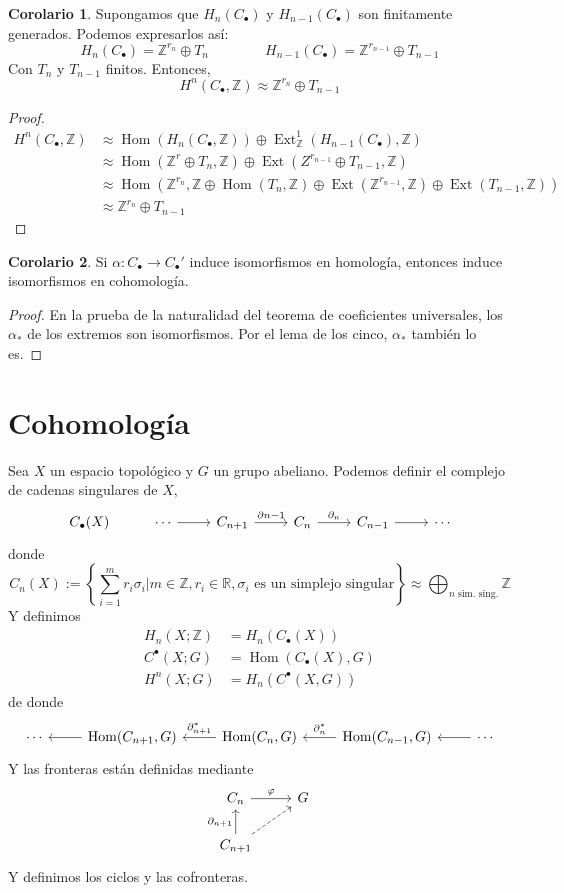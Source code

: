 \documentclass[spanish]{book}
\theoremstyle{definition}
\newtheorem*{coro}{Corolario}
\newcommand{\R}{\mathbb{R}}
\newcommand{\Z}{\mathbb{Z}}
\DeclareMathOperator{\Hom}{Hom}
\DeclareMathOperator{\Ext}{Ext}
\begin{document}
\begin{coro}
	Supongamos que $H_n(C_\bullet)$ y $H_{n-1}(C_\bullet)$ son finitamente generados. Podemos expresarlos así:
	\[H_n(C_\bullet)=\Z^{r_n}\oplus T_n\qquad\qquad H_{n-1}(C_\bullet)=\Z^{r_{n-1}}\oplus T_{n-1}\]
	Con $T_n$ y $T_{n-1}$ finitos. Entonces,
	\[H^n(C_\bullet,\Z)\approx\Z^{r_n}\oplus T_{n-1}\]
\end{coro}
\begin{proof}
	\begin{align*}
		H^n(C_\bullet,\Z)&\approx\Hom(H_n(C_\bullet,\Z))\oplus\Ext_\Z^1(H_{n-1}(C_\bullet),\Z)\\
		&\approx\Hom(\Z^r\oplus T_n,\Z)\oplus\Ext(Z^{r_{n-1}}\oplus T_{n-1},\Z)\\
		&\approx\Hom(\Z^{r_n},\Z\oplus\Hom(T_n,\Z)\oplus\Ext(\Z^{r_{n-1}},\Z)\oplus\Ext(T_{n-1},\Z))\\
		&\approx \Z^{r_n}\oplus T_{n-1}
	\end{align*}
\end{proof}
\begin{coro}
	Si $\alpha:C_\bullet\to C_\bullet'$ induce isomorfismos en homología, entonces induce isomorfismos en cohomología.
\end{coro}
\begin{proof}
	En la prueba de la naturalidad del teorema de coeficientes universales, los $\alpha_*$ de los extremos son isomorfismos. Por el lema de los cinco, $\alpha_*$ también lo es.
\end{proof}

\chapter{Cohomología}
Sea $X$ un espacio topológico y $G$ un grupo abeliano. Podemos definir el complejo de cadenas singulares de $X$,
\[\begin{tikzcd}
	C_\bullet(X)&\cdots\arrow[r]&C_{n+1}\arrow[r,"\partial{n-1}"]&C_n\arrow[r,"\partial_n"]&C_{n-1}\arrow[r]&\cdots
\end{tikzcd}\]
donde 
	\[C_n(X):=\left\{\sum_{i=1}^mr_i\sigma_i|m\in\Z,r_i\in\R,\sigma_i\text{ es un simplejo singular}\right\}\approx\bigoplus_{n\text{ sim. sing.}}\Z\]
Y definimos
\begin{align*}
	H_n(X;\Z)&=H_n(C_\bullet(X))\\
	C^\bullet(X;G)&=\Hom(C_\bullet(X),G)\\
	H^n(X;G)&=H_n(C^\bullet(X,G))
\end{align*}
de donde
\[\begin{tikzcd}
	\cdots&\Hom(C_{n+1},G)\arrow[l]&\Hom(C_n,G)\arrow[l,swap,"\partial_{n+1}^*"]&\Hom(C_{n-1},G)\arrow[l,swap,"\partial_n^*"]&\cdots\arrow[l]
\end{tikzcd}\]
Y las fronteras están definidas mediante
\[\begin{tikzcd}
	C_n\arrow[r,"\varphi"]&G\\
	C_{n+1}\arrow[u,"\partial_{n+1}"]\arrow[ur,dashed]
\end{tikzcd}\]
Y definimos los ciclos y las cofronteras.
\end{document}
